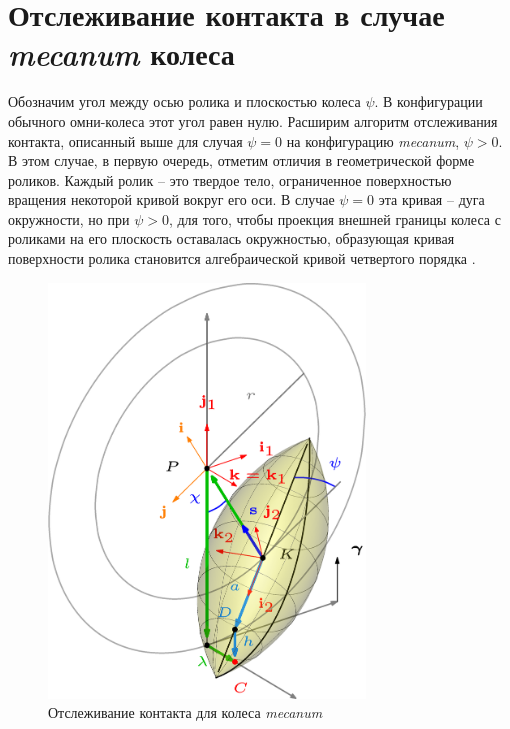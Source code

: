 \section{Отслеживание контакта в случае \textit{mecanum} колеса}\label{sect:track_mecanum}

Обозначим угол между осью ролика и плоскостью колеса $\psi$. В конфигурации обычного омни-колеса этот угол равен нулю. Расширим алгоритм отслеживания контакта, описанный выше для случая $\psi = 0$ на конфигурацию \textit{mecanum}, $\psi > 0$. В этом случае, в первую очередь, отметим отличия в геометрической форме роликов. Каждый ролик -- это твердое тело, ограниченное поверхностью вращения некоторой кривой вокруг его оси. В случае $\psi = 0$ эта кривая -- дуга окружности, но при $\psi > 0$, для того, чтобы проекция внешней границы колеса с роликами на его плоскость оставалась окружностью, образующая кривая поверхности ролика становится алгебраической кривой четвертого порядка \cite{Gfrerrer2008}.

\begin{figure}[H]
    \centering
    \includegraphics[width=0.75\textwidth]{./content/pic/asy/pic_mecanum.png}
    \caption{Отслеживание контакта для колеса \textit{mecanum}}
    \label{fig:mecanum}
\end{figure}

